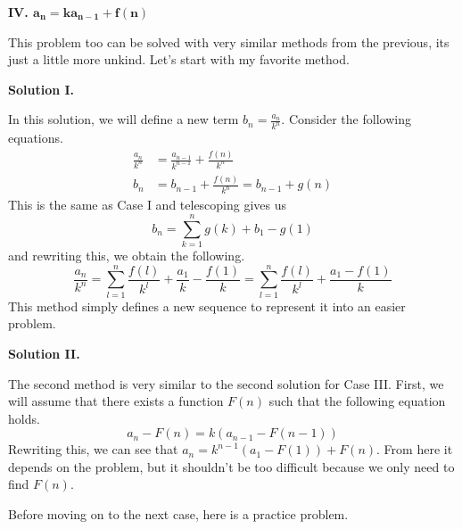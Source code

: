 \documentclass[../../../main.tex]{subfiles}
\begin{document}
{\Large\textcolor{BrickRed}
{\textbf{IV. $\mathbf{a_n = k a_{n-1} + f(n)}$}}}

This problem too can be solved with very similar methods from the
previous, its just a little more unkind. Let's start with my
favorite method.

{\large\textbf{Solution I.}}

In this solution, we will define a new term $b_n = \frac{a_n}{k^n}$.
Consider the following equations.
\begin{align*}
    \frac{a_n}{k^n} &= \frac{a_{n-1}}{k^{n-1}} + \frac{f(n)}{k^n} \\
    b_n
    &= b_{n-1} + \frac{f(n)}{k^n}
    = b_{n-1} + g(n)
\end{align*}
This is the same as Case I and telescoping gives us
\[
b_n = \sum_{k=1}^n g(k) + b_1 - g(1)
\]
and rewriting this, we obtain the following.
\[
\frac{a_n}{k^n}
= \sum_{l=1}^n \frac{f(l)}{k^l} + \frac{a_1}{k} - \frac{f(1)}{k}
= \sum_{l=1}^n \frac{f(l)}{k^l} + \frac{a_1 - f(1)}{k}
\]
This method simply defines a new sequence to represent it into an
easier problem.

{\large\textbf{Solution II.}}

The second method is very similar to the second solution for Case III.
First, we will assume that there exists a function $F(n)$ such that
the following equation holds.
\[
a_n - F(n) = k(a_{n-1} - F(n-1))
\]
Rewriting this, we can see that $a_n = k^{n-1} (a_1 - F(1)) + F(n)$.
From here it depends on the problem, but it shouldn't be too difficult
because we only need to find $F(n)$.

Before moving on to the next case, here is a practice problem.
\end{document}
